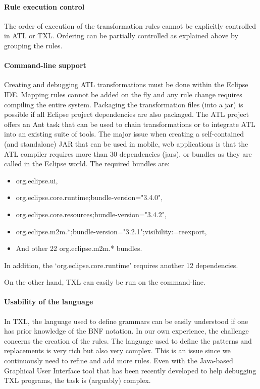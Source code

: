 \paragraph*{Rule execution control} 

The order of execution of the transformation rules cannot be explicitly controlled in ATL or TXL. Ordering can be partially controlled as explained above by grouping the rules.

\paragraph*{Command-line support} 

Creating and debugging ATL transformations must be done within the Eclipse IDE. Mapping rules cannot be added on the fly and any rule change requires compiling the entire system. Packaging the transformation files (into a jar) is possible if all Eclipse project dependencies are also packaged. The ATL project offers an Ant task that can be used to chain transformations or to integrate ATL into an existing suite of tools. The major issue when creating a self-contained (and standalone) JAR that can be used in mobile, web applications is that the ATL compiler requires more than 30 dependencies (jars), or bundles as they are called in the Eclipse world. The required bundles are:

\begin{itemize}
\item org.eclipse.ui,
\item org.eclipse.core.runtime;bundle-version="3.4.0",
\item org.eclipse.core.resources;bundle-version="3.4.2",
\item org.eclipse.m2m.*;bundle-version="3.2.1";visibility:=reexport,
\item And other 22 org.eclipse.m2m.* bundles.
\end{itemize}

In addition, the `org.eclipse.core.runtime' requires another 12 dependencies. 

On the other hand, TXL can easily be run on the command-line. 

\paragraph*{Usability of the language} 

In TXL, the language used to define grammars can be easily understood if one has prior knowledge of the BNF notation. In our own experience, the challenge concerns the creation of the rules. The language used to define the patterns and replacements is very rich but also very complex. This is an issue since we continuously need to refine and add more rules. Even with the Java-based Graphical User Interface tool that has been recently developed to help debugging TXL programs, the task is (arguably) complex. 

